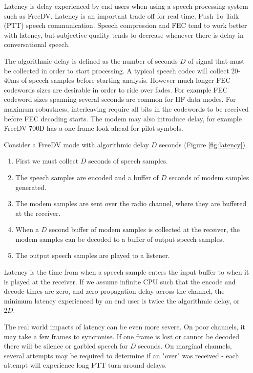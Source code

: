 \documentclass{article}
\begin{document}
Latency is delay experienced by end users when using a speech processing system such as FreeDV. Latency is an important trade off for real time, Push To Talk (PTT) speech communication. Speech compression and FEC tend to work better with latency, but subjective quality tends to decrease whenever there is delay in conversational speech.

The algorithmic delay is defined as the number of seconds $D$ of signal that must be collected in order to start processing. A typical speech codec will collect 20-40ms of speech samples before starting analysis.  However much longer FEC codewords sizes are desirable in order to ride over fades.  For example FEC codeword sizes spanning several seconds are common for HF data modes.  For maximum robustness, interleaving require all bits in the codewords to be received before FEC decoding starts.  The modem may also introduce delay, for example FreeDV 700D has a one frame look ahead for pilot symbols.

Consider a FreeDV mode with algorithmic delay $D$ seconds (Figure \ref{fig:latency})
\begin{enumerate}
\item First we must collect $D$ seconds of speech samples.
\item The speech samples are encoded and a buffer of $D$ seconds of modem samples generated.
\item The modem samples are sent over the radio channel, where they are buffered at the receiver.
\item When a $D$ second buffer of modem samples is collected at the receiver, the modem samples can be decoded to a buffer of output speech samples.
\item The output speech samples are played to a listener.
\end{enumerate}  

Latency is the time from when a speech sample enters the input buffer to when it is played at the receiver. If we assume infinite CPU such that the encode and decode times are zero, and zero propagation delay across the channel, the minimum latency experienced by an end user is twice the algorithmic delay, or $2D$.

The real world impacts of latency can be even more severe.  On poor channels, it may take a few frames to  syncronise.  If one frame is lost or cannot be decoded there will be silence or garbled speech for $D$ seconds.  On marginal channels, several attempts may be required to determine if an "over" was received - each attempt will experience long PTT turn around delays.
\end{document}
